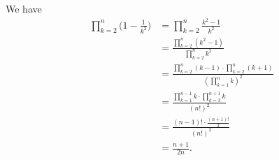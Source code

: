 \exercise
We have
\begin{align*}
    \prod_{k=2}^n\biggl(1-\frac{1}{k^2}\biggr) &= \prod_{k=2}^n\frac{k^2-1}{k^2} \\[3pt]
    &= \frac{\prod_{k=2}^n(k^2-1)}{\prod_{k=2}^nk^2} \\[3pt]
    &= \frac{\prod_{k=2}^n(k-1) \cdot \prod_{k=2}^n(k+1)}{\left(\prod_{k=1}^nk\right)^2} \\[3pt]
    &= \frac{\prod_{k=1}^{n-1}k \cdot \prod_{k=3}^{n+1}k}{(n!)^2} \\
    &= \frac{(n-1)! \cdot \frac{(n+1)!}{2}}{(n!)^2} \\
    &= \frac{n+1}{2n}.
\end{align*}
